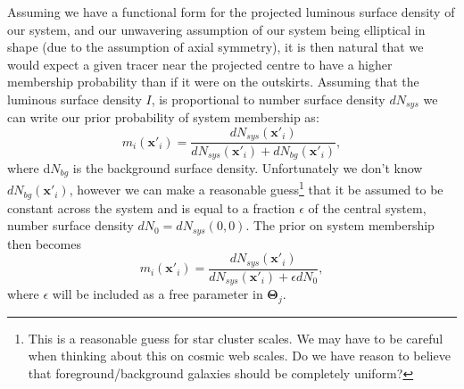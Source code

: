 Assuming we have a functional form for the projected luminous surface density of our system, and our unwavering assumption of our system being elliptical in shape (due to the assumption of axial symmetry), it is then natural that we would expect a given tracer near the projected centre to have a higher membership probability than if it were on the outskirts. Assuming that the luminous surface density $I$, is proportional to number surface density $dN_{sys}$ we can write our prior probability of system membership as:
\begin{equation}
m_{i}(\boldsymbol{x}'_{i}) = \frac{dN_{sys}(\boldsymbol{x}'_{i})}{dN_{sys}(\boldsymbol{x}'_{i}) + dN_{bg}(\boldsymbol{x}'_{i})},
\end{equation}
where d$N_{bg}$ is the background surface density. Unfortunately we don't know $dN_{bg}(\boldsymbol{x}'_{i})$, however we can make a reasonable guess\footnote{This is a reasonable guess for star cluster scales. We may have to be careful when thinking about this on cosmic web scales. Do we have reason to believe that foreground/background galaxies should be completely uniform?} that it be assumed to be constant across the system and is equal to a fraction $\epsilon$ of the central system, number surface density $dN_{0} = dN_{sys}(0,0)$. The prior on system membership then becomes
\begin{equation}
m_{i}(\boldsymbol{x}'_{i}) = \frac{dN_{sys}(\boldsymbol{x}'_{i})}{dN_{sys}(\boldsymbol{x}'_{i}) + \epsilon dN_{0}},
\end{equation}
where $\epsilon$ will be included as a free parameter in $\boldsymbol{\Theta}_{j}$.

